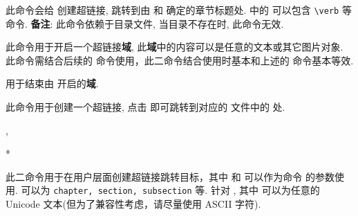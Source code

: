 \begin{function}[added=2025-09-20]{\ztexlinkclass}
  \begin{syntax}
    \cmd{\ztexlinkclass}
    \cmd{\ztexlinkclass*}
  \end{syntax}
  此命令会给  创建超链接, 跳转到由  和 
  确定的章节标题处. \cmd{\ztexlinkclass*} 中的  可以包含
  \verb!\verb! 等命令. \textbf{备注}: 此命令依赖于目录文件, 当目录不存在时, 此命令无效.
\end{function}



\begin{function}[added=2024-12-05]{\hyper@linkstart}
  \begin{syntax}
    \cmd{\hyper@linkstart}
  \end{syntax}
  此命令用于开启一个超链接\textbf{域}, 此\textbf{域}中的内容可以是任意的文本或其它图片对象. 此命令需结合后续的
  \cmd{\hyper@linkend} 命令使用，此二命令结合使用时基本和上述的 \cmd{\hyper@link} 命令基本等效.
\end{function}


\begin{function}[added=2024-12-05]{\hyper@linkend}
  用于结束由 \cmd{\hyper@linkstart} 开启的\textbf{域}.
\end{function}


\begin{function}[added=2024-12-05]{\hyper@linkfile}
  \begin{syntax}
    \cmd{\hyper@linkfile}
  \end{syntax}
  此命令用于创建一个超链接, 点击 即可跳转到对应的  文件中的  处.
\end{function}

\begin{function}[added=2024-12-05]{\MakeLinkTarget,\MakeLinkTarget*}
  \begin{syntax}
  *
  \end{syntax}
  此二命令用于在用户层面创建超链接跳转目标，其中  和  可以作为命令
  \cmd{\hyper@link} 的参数使用.  可以为 \texttt{chapter, section, subsection} 等.
  针对 , 其中  可以为任意的 Unicode 文本(但为了兼容性考虑，请尽量使用 ASCII 字符).
\end{function}



